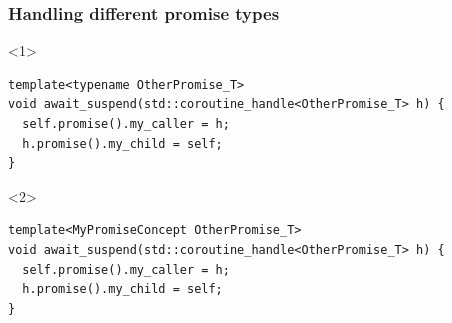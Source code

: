 \documentclass[aspectratio=169]{beamer}
\begin{document}
\begin{frame}[fragile]
  \frametitle{Handling different promise types}

  \begin{onlyenv}<1>
  \begin{lstlisting}[style=cpp20]
template<typename OtherPromise_T>
void await_suspend(std::coroutine_handle<OtherPromise_T> h) {
  self.promise().my_caller = h;
  h.promise().my_child = self;
}
  \end{lstlisting}
  \end{onlyenv}
  \begin{onlyenv}<2>
  \begin{lstlisting}[style=cpp20]
template<MyPromiseConcept OtherPromise_T>
void await_suspend(std::coroutine_handle<OtherPromise_T> h) {
  self.promise().my_caller = h;
  h.promise().my_child = self;
}
  \end{lstlisting}
  \end{onlyenv}
\end{frame}
\end{document}
